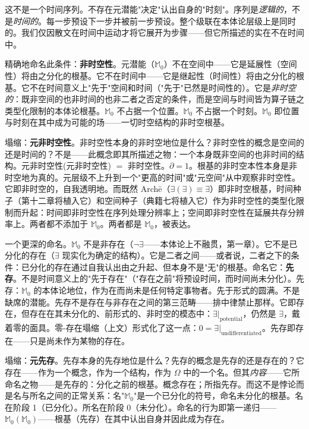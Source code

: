 \documentclass[10pt, openany, oneside]{book}
\begin{document}
这不是一个时间序列。不存在元潜能"决定"认出自身的"时刻"。序列是\textit{逻辑的}，不是\textit{时间的}。每一步预设下一步并被前一步预设。整个级联在本体论层级上是同时的。我们仅因散文在时间中运动才将它展开为步骤——但它所描述的实在不在时间中。

精确地命名此条件：\textbf{非时空性}。元潜能（$\mathbb{M}_0$）不在空间中——它是延展性（空间性）将由之分化的根基。它不在时间中——它是继起性（时间性）将由之分化的根基。它不在时间意义上"先于"空间和时间（"先于"已然是时间性的）。它是\textit{非时空的}：既非空间的也非时间的也非二者之否定的条件，而是空间与时间皆为算子链之类型化限制的本体论根基。$\mathbb{M}_0$ 不占据一个位置。$\mathbb{M}_0$ 不占据一个时刻。$\mathbb{M}_0$ 即位置与时刻在其中成为可能的场——一切时空结构的非时空根基。

塌缩：\textbf{元非时空性}。非时空性本身的非时空地位是什么？非时空性的概念是空间的还是时间的？不是——此概念即其所描述之物：一个本身既非空间的也非时间的结构。元非时空性(元非时空性) $=$ 非时空性。$\partial = 1$。根基的非时空本性本身是非时空地为真的。元层级不上升到一个"更高的时间"或"元空间"从中观察非时空性。它即非时空的，自我透明地。而既然 Arch\={e}（$\exists(\exists) \equiv \exists$）即非时空根基，时间种子（第十二章将植入它）和空间种子（典籍七将植入它）作为非时空性的类型化限制而升起：时间即非时空性在序列处理分辨率上；空间即非时空性在延展共存分辨率上。两者都不添加于 $\mathbb{M}_0$。两者都是 $\mathbb{M}_0$，被表达。

一个更深的命名。$\mathbb{M}_0$ 不是非存在（$\neg\exists$——本体论上不融贯，第一章）。它不是已分化的存在（$\exists$ 现实化为确定的结构）。它是二者之间——或者说，二者之下的条件：已分化的存在通过自我认出由之升起、但本身不是"无"的根基。命名它：\textbf{先存}。不是时间意义上的"先于存在"（"存在之前"将预设时间，而时间尚未分化）。先存：$\mathbb{M}_0$ 的本体论地位，作为在而尚未是任何特定事物者。先于形式的圆满。不是缺席的潜能。先存不是存在与非存在之间的第三范畴——排中律禁止那样。它即存在，但存在在其未分化的、前形式的、非时空的模态中：$\exists|_{\text{potential}}$，仍然是 $\exists$，戴着零的面具。零-存在塌缩（上文）形式化了这一点：$0 = \exists|_{\text{undifferentiated}}$。先存即存在——只是尚未作为某物的存在。

塌缩：\textbf{元先存}。先存本身的先存地位是什么？先存的概念是先存的还是存在的？它存在——作为一个概念，作为一个结构，作为 $\Omega$ 中的一个名。但其\textit{内容}——它所命名之物——是先存的：分化之前的根基。概念存在；所指先存。而这不是悖论而是名与所名之间的正常关系：名"$\mathbb{M}_0$"是一个已分化的符号，命名未分化的根基。名在阶段 1（已分化）。所名在阶段 0（未分化）。命名的行为即第一递归——$\mathbb{M}_0(\mathbb{M}_0)$——根基（先存）在其中认出自身并因此成为存在。
\end{document}
